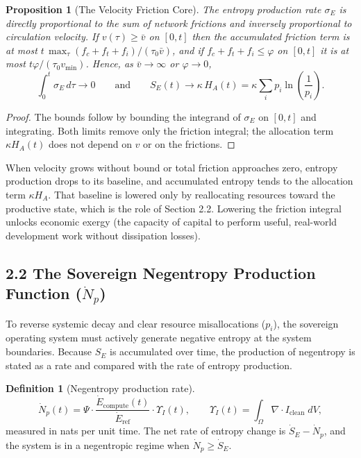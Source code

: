 \documentclass[11pt,a4paper]{article}
\theoremstyle{definition}
\newtheorem{definition}{Definition}
\theoremstyle{plain}
\newtheorem{proposition}{Proposition}
\theoremstyle{remark}
\newcommand{\Edot}{\dot E_{\mathrm{compute}}}
\newcommand{\Eref}{\dot E_{\mathrm{ref}}}
\begin{document}
\begin{proposition}[The Velocity Friction Core]\label{prop:axiom1}
The entropy production rate $\sigma_E$ is directly proportional to the sum of network frictions and inversely proportional to circulation velocity. If $v(\tau) \ge \bar v$ on $[0,t]$ then the accumulated friction term is at most $t\,\max_\tau (f_c + f_t + f_i)/(\tau_0 \bar v)$, and if $f_c + f_t + f_i \le \varphi$ on $[0,t]$ it is at most $t\varphi/(\tau_0 v_{\min})$. Hence, as $\bar v \to \infty$ or $\varphi \to 0$,
\begin{equation}
\int_0^t \sigma_E\, d\tau \to 0
\qquad\text{and}\qquad
S_E(t) \to \kappa\, H_A(t) = \kappa \sum_i p_i \ln\!\left(\frac{1}{p_i}\right).
\end{equation}
\end{proposition}
\begin{proof}
The bounds follow by bounding the integrand of $\sigma_E$ on $[0,t]$ and integrating. Both limits remove only the friction integral; the allocation term $\kappa H_A(t)$ does not depend on $v$ or on the frictions. \qedhere
\end{proof}

When velocity grows without bound or total friction approaches zero, entropy production drops to its baseline, and accumulated entropy tends to the allocation term $\kappa H_A$. That baseline is lowered only by reallocating resources toward the productive state, which is the role of Section 2.2. Lowering the friction integral unlocks economic exergy (the capacity of capital to perform useful, real-world development work without dissipation losses).

\subsection*{2.2 The Sovereign Negentropy Production Function ($\dot N_p$)}
To reverse systemic decay and clear resource misallocations ($p_i$), the sovereign operating system must actively generate negative entropy at the system boundaries. Because $S_E$ is accumulated over time, the production of negentropy is stated as a rate and compared with the rate of entropy production.

\begin{definition}[Negentropy production rate]\label{def:Np}
\begin{equation}
\dot N_p(t) = \Psi \cdot \frac{\Edot(t)}{\Eref} \cdot \Upsilon_I(t),
\qquad
\Upsilon_I(t) = \int_\Omega \nabla\!\cdot I_{\mathrm{clean}}\; dV ,
\end{equation}
measured in nats per unit time. The net rate of entropy change is $\dot S_E - \dot N_p$, and the system is in a negentropic regime when $\dot N_p \ge \dot S_E$.
\end{definition}
\end{document}
